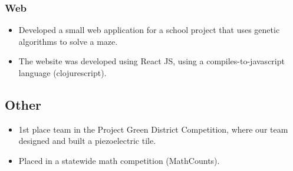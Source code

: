 \documentclass[12pt]{article}
\begin{document}
\subsubsection{Web}
\begin{itemize}
\item Developed a small web application for a school project that uses genetic
  algorithms to solve a maze.  
\item The website was developed using React JS, using a compiles-to-javascript
  language (clojurescript). 
\end{itemize}

\subsection{Other}
\begin{itemize}
\item 1st place team in the Project Green District Competition, where our team
  designed and built a piezoelectric tile.
\item Placed in a statewide math competition (MathCounts).
\end{itemize}
\end{document}
